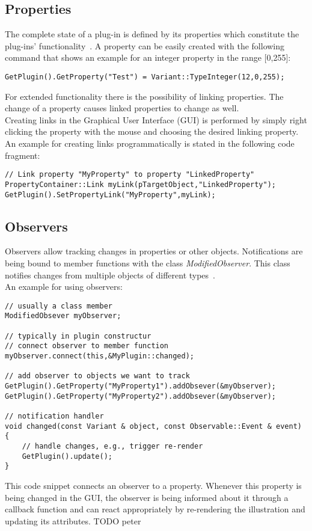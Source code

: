 \subsection{Properties}
The complete state of a plug-in is defined by its properties which constitute the plug-ins' functionality~\cite{misc:volumeshop101}. A property can be easily created with the following command that shows an example for an integer property in the range [0,255]:
\begin{lstlisting}
GetPlugin().GetProperty("Test") = Variant::TypeInteger(12,0,255);
\end{lstlisting}
For extended functionality there is the possibility of linking properties. The change of a property causes linked properties to change as well.\\
Creating links in the Graphical User Interface (GUI) is performed by simply right clicking the property with the mouse and choosing the desired linking property.\\
An example for creating links programmatically is stated in the following code fragment:
\begin{lstlisting}
// Link property "MyProperty" to property "LinkedProperty"
PropertyContainer::Link myLink(pTargetObject,"LinkedProperty");
GetPlugin().SetPropertyLink("MyProperty",myLink);
\end{lstlisting}

\subsection{Observers}
\label{chap:observers}
Observers allow tracking changes in properties or other objects. Notifications are being bound to member functions with the class \emph{ModifiedObserver}. This class notifies changes from multiple objects of different types~\cite{misc:volumeshop101}.\\
An example for using observers:
\begin{lstlisting}
// usually a class member
ModifiedObsever myObserver;

// typically in plugin constructur
// connect observer to member function
myObserver.connect(this,&MyPlugin::changed);

// add observer to objects we want to track
GetPlugin().GetProperty("MyProperty1").addObsever(&myObserver);
GetPlugin().GetProperty("MyProperty2").addObsever(&myObserver);

// notification handler
void changed(const Variant & object, const Observable::Event & event)
{
	// handle changes, e.g., trigger re-render
	GetPlugin().update();
}
\end{lstlisting}
This code snippet connects an observer to a property. Whenever this property is being changed in the GUI, the observer is being informed about it through a callback function and can react appropriately by re-rendering the illustration and updating its attributes.
TODO peter

